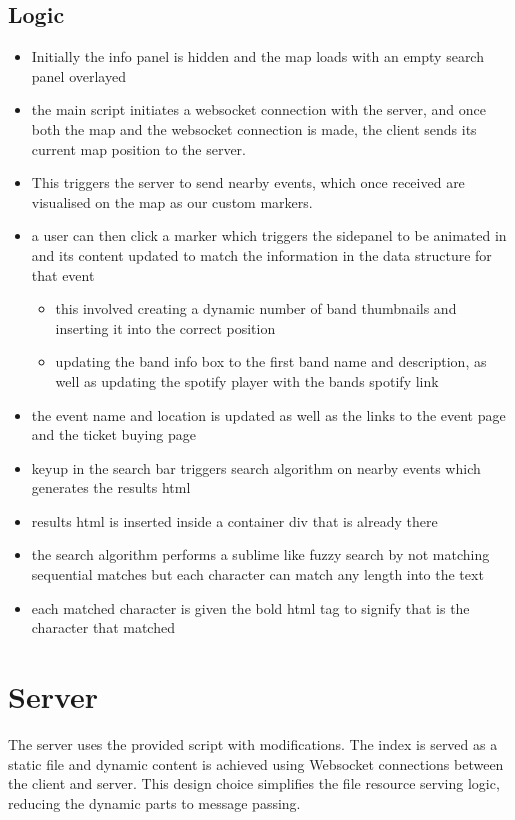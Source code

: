 \documentclass[10pt]{article}
\begin{document}
        \subsection{Logic}
            \begin{itemize}
                \item Initially the info panel is hidden and the map loads with an empty search panel overlayed
                \item the main script initiates a websocket connection with the server, and once both the map and the websocket connection is made, the client sends its current map position to the server.
                \item This triggers the server to send nearby events, which once received are visualised on the map as our custom markers.
                \item a user can then click a marker which triggers the sidepanel to be animated in and its content updated to match the information in the data structure for that event
                \begin{itemize}
                    \item this involved creating a dynamic number of band thumbnails and inserting it into the correct position
                    \item updating the band info box to the first band name and description, as well as updating the spotify player with the bands spotify link
                \end{itemize}
                \item the event name and location is updated as well as the links to the event page and the ticket buying page

                \item keyup in the search bar triggers search algorithm on nearby events which generates the results html
                \item results html is inserted inside a container div that is already there
                \item the search algorithm performs a sublime like fuzzy search by not matching sequential matches but each character can match any length into the text
                \item each matched character is given the bold html tag to signify that is the character that matched
            \end{itemize}
            


    \section{Server}
        The server uses the provided script with modifications. The index is served as a static file and dynamic content is achieved using Websocket connections between the client and server. This design choice simplifies the file resource serving logic, reducing the dynamic parts to message passing.
\end{document}
